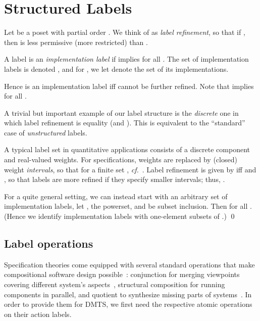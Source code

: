 \documentclass[twocolumn]{svjour3-dummy}
\newcommand*\cf{\textit{cf.}\xspace}
\begin{document}
\section{Structured Labels}
\label{se:structlabels}

Let  be a poset with partial order .  We think of
 as \emph{label refinement}, so that if , then 
is less permissive (more restricted) than .

\begin{definition}
  A label  is an \emph{implementation label} if  implies  for all .  The set of implementation
  labels is denoted , and for , we let  denote the set of its
  implementations.
\end{definition}

Hence  is an implementation label iff  cannot be further
refined.  Note that  implies 
for all .

\begin{example}
  \label{ex:labelsets}
  A trivial but important example of our label structure is the
  \emph{discrete} one in which label refinement  is equality
  (and ).  This is equivalent to the ``standard'' case
  of \emph{unstructured} labels.

  A typical label set in quantitative applications consists of a
  discrete component and real-valued weights.  For specifications,
  weights are replaced by (closed) weight \emph{intervals}, so that
   for a finite set ,
  \cf~\cite{DBLP:journals/fmsd/BauerFJLLT13,
    DBLP:journals/mscs/BauerJLLS12}.  Label refinement is given by  iff  and , so that labels are more refined if they
  specify smaller intervals; thus, .

  For a quite general setting, we can instead start with an arbitrary
  set  of implementation labels, let , the
  powerset, and  be subset
  inclusion.  Then  for all .  (Hence we
  identify implementation labels with one-element subsets of .)
  \qed
\end{example}

\subsection{Label operations}

Specification theories come equipped with several standard operations
that make compositional software design
possible~\cite{DBLP:conf/fase/BauerDHLLNW12}: conjunction for merging
viewpoints covering different system's
aspects~\cite{DBLP:conf/sigsoft/UchitelC04,
  DBLP:conf/concur/Ben-DavidCU13}, structural composition for running
components in parallel, and quotient to synthesize missing parts of
systems~\cite{DBLP:conf/lics/LarsenX90}. In order to provide them
for DMTS, we first need the respective atomic operations on their action
labels.
\end{document}
